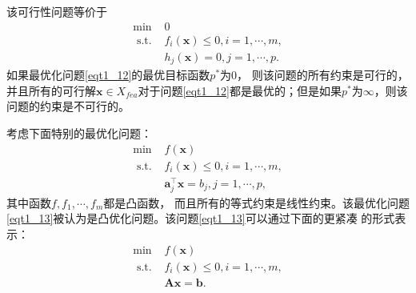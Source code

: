 该可行性问题等价于
\begin{equation}
\begin{array}{ll}
\min & 0 \\
\text { s.t. } & f_{i}(\bm{x}) \leq 0, i=1, \cdots, m ,\\
& h_{j}(\bm{x})=0, j=1, \cdots, p .
\end{array}
    \label{eqt1_12}
\end{equation}
如果最优化问题\ref{eqt1_12}的最优目标函数$  p^{*}  $为$ 0 $， 则该问题的所有约束是可行的，并且所有的可行解$  \bm{x} \in X_{f e a}  $对于问题\ref{eqt1_12}都是最优的；但是如果$  p^{*}  $为$
 \infty $，则该问题的约束是不可行的。
\par 考虑下面特别的最优化问题：
\begin{equation}
\begin{array}{ll}
\min & f(\bm{x}) \\
\text { s.t. } & f_{i}(\bm{x}) \leq 0, i=1, \cdots, m, \\
& \bm{a}_{j}^{\top} \bm{x}=b_{j}, j=1, \cdots, p,
\end{array}
    \label{eqt1_13}
\end{equation}
其中函数$  f, f_{1}, \cdots, f_{m}  $都是凸函数， 而且所有的等式约束是线性约束。该最优化问题\ref{eqt1_13}被认为是凸优化问题。该问题\ref{eqt1_13}可以通过下面的更紧凑 的形式表示：
\begin{equation}
\begin{array}{ll}
\min & f(\bm{x}) \\
\text { s.t. } & f_{i}(\bm{x}) \leq 0, i=1, \cdots, m, \\
& \bm{A} \bm{x}=\bm{b} .
\end{array}
    \label{eqt1_14}
\end{equation}


